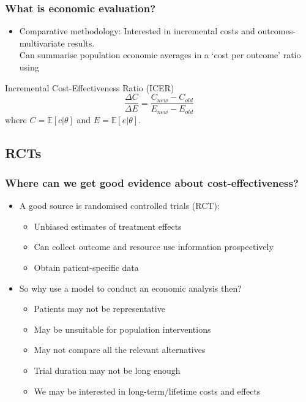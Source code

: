 \documentclass[t]{beamer}
\begin{document}
\begin{frame}
\frametitle{What is economic evaluation?}
	\begin{itemize}
			\item \alert{Comparative methodology}: Interested in incremental costs and outcomes- multivariate results.\\
			Can summarise population economic averages in a `cost per outcome' ratio using
	\end{itemize}
	
	\begin{definition}
Incremental Cost-Effectiveness Ratio (ICER)
$$
\frac{\Delta C}{\Delta E} = \frac{C_{new} - C_{old}}{E_{new} - E_{old}}
$$
where $C=\mathbb{E}[c|\theta]$ and $E=\mathbb{E}[e|\theta]$.
\end{definition}
	
\end{frame}


\subsection{RCTs}

\begin{frame}
\frametitle{Where can we get good evidence about cost-effectiveness?}
\begin{itemize}
\item A good source is \alert{randomised controlled trials (RCT)}:
	\begin{itemize}
		\item Unbiased estimates of treatment effects
		\item Can collect outcome and resource use information prospectively
		\item Obtain patient-specific data
	\end{itemize}
\item So why use a model to conduct an economic analysis then?
	\begin{itemize}
		\pause
		\item Patients may not be representative
		\pause
		\item May be unsuitable for population interventions
		\pause
		\item May not compare all the relevant alternatives
		\pause
		\item Trial duration may not be long enough
		\pause
		\item We may be interested in long-term/lifetime costs and effects
	\end{itemize}
\end{itemize}
\end{frame}
\end{document}
